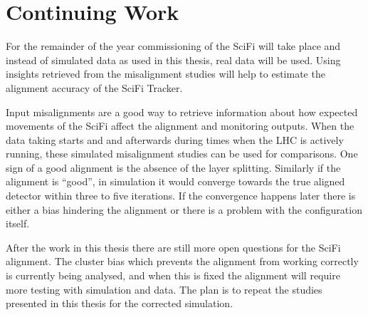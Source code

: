 \chapter{Continuing Work}
\label{sec:continue}
For the remainder of the year commissioning of the SciFi will take place and instead of simulated data as used in this thesis, real data will be used. Using insights retrieved from the misalignment studies will help to estimate the alignment accuracy of the SciFi Tracker.

Input misalignments are a good way to retrieve information about how expected movements of the SciFi affect the alignment and monitoring outputs. When the data taking starts and and afterwards during times when the LHC is actively running, these simulated misalignment studies can be used for comparisons.
One sign of a good alignment is the absence of the layer splitting.
Similarly if the alignment is ``good'', in simulation it would converge towards the true aligned detector within three to five iterations.
If the convergence happens later there is either a bias hindering the alignment or there is a problem with the configuration itself.

After the work in this thesis there are still more open questions for the SciFi alignment. The cluster bias which prevents the alignment from working correctly is currently being analysed, and when this is fixed the alignment will require more testing with simulation and data. The plan is to repeat the studies presented in this thesis for the corrected simulation.

